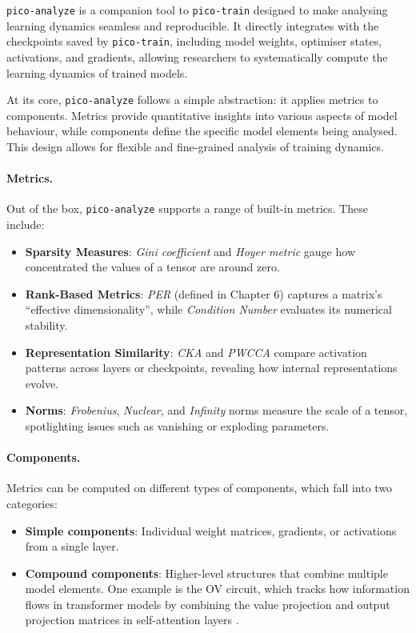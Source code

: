 \texttt{pico-analyze} is a companion tool to \texttt{pico-train} designed to make analysing learning dynamics seamless and reproducible. It directly integrates with the checkpoints saved by \texttt{pico-train}, including model weights, optimiser states, activations, and gradients, allowing researchers to systematically compute the learning dynamics of trained models.

At its core, \texttt{pico-analyze} follows a simple abstraction: it applies metrics to components. Metrics provide quantitative insights into various aspects of model behaviour, while components define the specific model elements being analysed. This design allows for flexible and fine-grained analysis of training dynamics. 

\paragraph{Metrics.} Out of the box, \texttt{pico-analyze} supports a range of built-in metrics. These include:
\begin{itemize}
    \item \textbf{Sparsity Measures}: \textit{Gini coefficient} \citep{hurley2009gini} and \textit{Hoyer metric} \citep{hoyer2004sparsity} gauge how concentrated the values of a tensor are around zero.

    \item \textbf{Rank-Based Metrics}: \textit{PER} (defined in Chapter 6) captures a matrix's “effective dimensionality”, while \textit{Condition Number} evaluates its numerical stability.

    \item \textbf{Representation Similarity}: \textit{CKA} \citep{kornblith2019cka} and \textit{PWCCA} \citep{morcos2018pwcca} compare activation patterns across layers or checkpoints, revealing how internal representations evolve.
    
    \item \textbf{Norms}: \textit{Frobenius}, \textit{Nuclear}, and \textit{Infinity} norms measure the scale of a tensor, spotlighting issues such as vanishing or exploding parameters.
\end{itemize}

\paragraph{Components.} Metrics can be computed on different types of components, which fall into two categories: 
\begin{itemize} 
\item \textbf{Simple components}: Individual weight matrices, gradients, or activations from a single layer. 
\item \textbf{Compound components}: Higher-level structures that combine multiple model elements. One example is the OV circuit, which tracks how information flows in transformer models by combining the value projection and output projection matrices in self-attention layers \cite{elhage2021mathematical}. 
\end{itemize}

